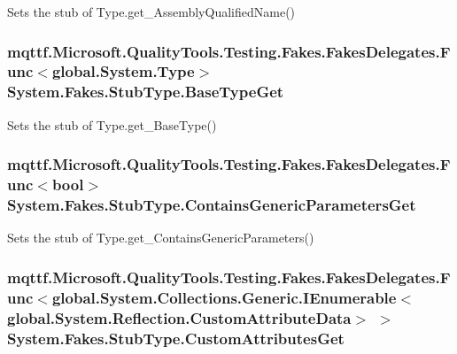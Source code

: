 Sets the stub of Type.\-get\-\_\-\-Assembly\-Qualified\-Name()

\hypertarget{class_system_1_1_fakes_1_1_stub_type_a4534c016838343e90e5823c901f2545a}{
\subsubsection[{Base\-Type\-Get}]{\setlength{\rightskip}{0pt plus 5cm}mqttf.\-Microsoft.\-Quality\-Tools.\-Testing.\-Fakes.\-Fakes\-Delegates.\-Func$<$global.\-System.\-Type$>$ System.\-Fakes.\-Stub\-Type.\-Base\-Type\-Get}}\label{class_system_1_1_fakes_1_1_stub_type_a4534c016838343e90e5823c901f2545a}


Sets the stub of Type.\-get\-\_\-\-Base\-Type()

\hypertarget{class_system_1_1_fakes_1_1_stub_type_aceb5da953d4c32985ef17f85ce886c98}{
\subsubsection[{Contains\-Generic\-Parameters\-Get}]{\setlength{\rightskip}{0pt plus 5cm}mqttf.\-Microsoft.\-Quality\-Tools.\-Testing.\-Fakes.\-Fakes\-Delegates.\-Func$<$bool$>$ System.\-Fakes.\-Stub\-Type.\-Contains\-Generic\-Parameters\-Get}}\label{class_system_1_1_fakes_1_1_stub_type_aceb5da953d4c32985ef17f85ce886c98}


Sets the stub of Type.\-get\-\_\-\-Contains\-Generic\-Parameters()

\hypertarget{class_system_1_1_fakes_1_1_stub_type_a47586c9b653221579f7851bdf9c51fe5}{
\subsubsection[{Custom\-Attributes\-Get}]{\setlength{\rightskip}{0pt plus 5cm}mqttf.\-Microsoft.\-Quality\-Tools.\-Testing.\-Fakes.\-Fakes\-Delegates.\-Func$<$global.\-System.\-Collections.\-Generic.\-I\-Enumerable$<$global.\-System.\-Reflection.\-Custom\-Attribute\-Data$>$ $>$ System.\-Fakes.\-Stub\-Type.\-Custom\-Attributes\-Get}}\label{class_system_1_1_fakes_1_1_stub_type_a47586c9b653221579f7851bdf9c51fe5}


